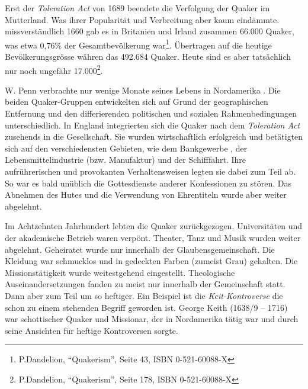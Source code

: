 \medskip

Erst der \textit{Toleration Act}  von 1689 beendete die
Verfolgung der Quaker im
Mutterland. Was ihrer Popularität und Verbreitung aber kaum eindämmte.%
missverständlich%
  1660 gab
es in Britanien  und Irland  zusammen
66.000 Quaker, was etwa 0,76\% der
Gesamtbevölkerung war\footnote{P.Dandelion, "`Quakerism"', Seite 43, ISBN
0-521-60088-X}. Übertragen auf die heutige Bevölkerungsgrösse währen das 492.684
Quaker. Heute sind es aber tatsächlich nur noch ungefähr
17.000\footnote{P.Dandelion, "`Quakerism"', Seite 178, ISBN 0-521-60088-X}.

\medskip

W. Penn verbrachte nur wenige Monate seines Lebens in Nordamerika
. Die beiden
Quaker-Gruppen entwickelten sich auf Grund der geographischen Entfernung und den
differierenden politischen und sozialen Rahmenbedingungen unterschiedlich. In
England integrierten sich die Quaker nach dem \textit{Toleration Act} zusehends
in die Gesellschaft. Sie wurden  wirtschaftlich
erfolgreich und betätigten sich
auf den verschiedensten Gebieten, wie dem Bankgewerbe , der
Lebensmittelindustrie 
(bzw. Manufaktur) und der Schifffahrt. Ihre aufrührerischen und provokanten
Verhaltensweisen legten sie dabei zum Teil ab. So war es bald unüblich die
Gottesdienste  anderer Konfessionen
 zu stören. Das Abnehmen des Hutes und die
Verwendung von Ehrentiteln wurde aber weiter abgelehnt.

\medskip

Im Achtzehnten Jahrhundert lebten die Quaker zurückgezogen.
Universitäten  und der akademische Betrieb waren verpönt.
 Theater, Tanz  und Musik 
wurden weiter abgelehnt. Geheiratet  wurde nur innerhalb der
Glaubensgemeinschaft. Die Kleidung  war schmucklos und in
gedeckten Farben
(zumeist Grau) gehalten. Die Missionstätigkeit wurde weitestgehend eingestellt.
Theologische Auseinandersetzungen fanden zu meist nur innerhalb der Gemeinschaft
statt. Dann aber zum Teil um so heftiger. Ein Beispiel ist die
\textit{Keit-Kontroverse}  die schon zu einem stehenden
Begriff geworden ist.
George Keith (1638/9 -- 1716)  war schottischer
Quaker und Missionar, der in
Nordamerika tätig war und durch seine Ansichten für heftige Kontroversen
sorgte.

